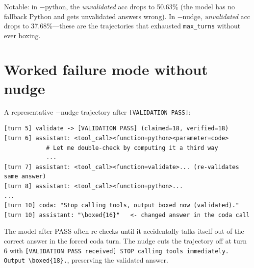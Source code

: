 \documentclass[10pt]{article}
\begin{document}
Notable: in $-$python, the \emph{unvalidated} acc drops to 50.63\% (the model has no fallback Python and gets unvalidated answers wrong). In $-$nudge, \emph{unvalidated} acc drops to 37.68\%---these are the trajectories that exhausted \texttt{max\_turns} without ever boxing.

\section{Worked failure mode without nudge}

A representative $-$nudge trajectory after \texttt{[VALIDATION PASS]}:

\begin{lstlisting}
[turn 5] validate -> [VALIDATION PASS] (claimed=18, verified=18)
[turn 6] assistant: <tool_call><function=python><parameter=code>
            # Let me double-check by computing it a third way
            ...
[turn 7] assistant: <tool_call><function=validate>... (re-validates same answer)
[turn 8] assistant: <tool_call><function=python>...
...
[turn 10] coda: "Stop calling tools, output boxed now (validated)."
[turn 10] assistant: "\boxed{16}"   <- changed answer in the coda call
\end{lstlisting}

The model after PASS often re-checks until it accidentally talks itself out of the correct answer in the forced coda turn. The nudge cuts the trajectory off at turn 6 with \texttt{[VALIDATION PASS received] STOP calling tools immediately. Output \textbackslash boxed\{18\}.}, preserving the validated answer.
\end{document}
